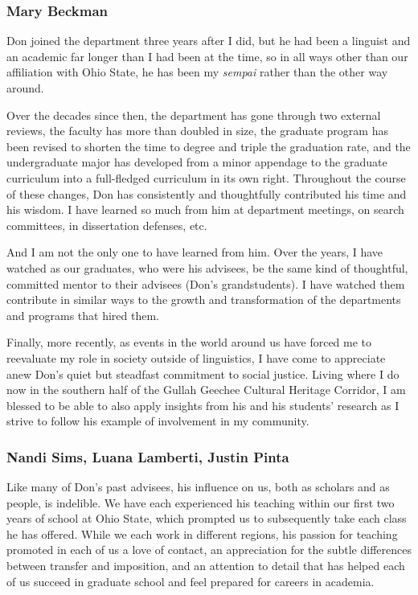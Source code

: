 \documentclass[output=paper, colorlinks,citecolor=brown]{langscibook}
\begin{document}
\subsubsection{Mary Beckman}
Don joined the department three years after I did, but he had been a linguist and an academic far longer than I had been at the time, so in all ways other than our affiliation with Ohio State, he has been my \textit{sempai} rather than the other way around. 

Over the decades since then, the department has gone through two external reviews, the faculty has more than doubled in size, the graduate program has been revised to shorten the time to degree and triple the graduation rate, and the undergraduate major has developed from a minor appendage to the graduate curriculum into a full-fledged curriculum in its own right. Throughout the course of these changes, Don has consistently and thoughtfully contributed his time and his wisdom. I have learned so much from him at department meetings, on search committees, in dissertation defenses, etc. 

And I am not the only one to have learned from him. Over the years, I have watched as our graduates, who were his advisees, be the same kind of thoughtful, committed mentor to their advisees (Don’s grandstudents).  I have watched them contribute in similar ways to the growth and transformation of the departments and programs that hired them.  

Finally, more recently, as events in the world around us have forced me to reevaluate my role in society outside of linguistics, I have come to appreciate anew Don’s quiet but steadfast commitment to social justice. Living where I do now in the southern half of the Gullah Geechee Cultural Heritage Corridor, I am blessed to be able to also apply insights from his and his students’ research as I strive to follow his example of involvement in my community. 

\subsubsection{Nandi Sims, Luana Lamberti, Justin Pinta}
Like many of Don’s past advisees, his influence on us, both as scholars and as people, is indelible. We have each experienced his teaching within our first two years of school at Ohio State, which prompted us to subsequently take each class he has offered. While we each work in different regions, his passion for teaching promoted in each of us a love of contact, an appreciation for the subtle differences between transfer and imposition, and an attention to detail that has helped each of us succeed in graduate school and feel prepared for careers in academia. 
\end{document}
